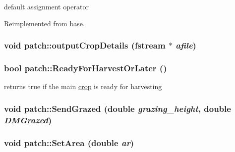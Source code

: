 default assignment operator 

Reimplemented from \hyperlink{classbase_abd18e2130f975aacfde1833ad137e3c5}{base}.\hypertarget{classpatch_a4b4356190e88f7e5d1a538173556cc18}{
\subsubsection[{outputCropDetails}]{\setlength{\rightskip}{0pt plus 5cm}void patch::outputCropDetails (fstream $\ast$ {\em afile})}}
\label{classpatch_a4b4356190e88f7e5d1a538173556cc18}
\hypertarget{classpatch_add309282252f1c83d6ad6ff827bd0c23}{
\subsubsection[{ReadyForHarvestOrLater}]{\setlength{\rightskip}{0pt plus 5cm}bool patch::ReadyForHarvestOrLater ()}}
\label{classpatch_add309282252f1c83d6ad6ff827bd0c23}


returns true if the main \hyperlink{classcrop}{crop} is ready for harvesting \hypertarget{classpatch_a91c94802f8e2ebc3ebec73412165b2c3}{
\subsubsection[{SendGrazed}]{\setlength{\rightskip}{0pt plus 5cm}void patch::SendGrazed (double {\em grazing\_\-height}, \/  double {\em DMGrazed})}}
\label{classpatch_a91c94802f8e2ebc3ebec73412165b2c3}
\hypertarget{classpatch_aa6e819a227c7d5aeceda53afad1de51f}{
\subsubsection[{SetArea}]{\setlength{\rightskip}{0pt plus 5cm}void patch::SetArea (double {\em ar})}}
\label{classpatch_aa6e819a227c7d5aeceda53afad1de51f}


